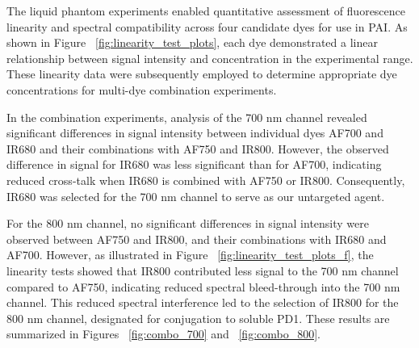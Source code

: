 The liquid phantom experiments enabled quantitative assessment of fluorescence linearity and spectral compatibility across four candidate dyes for use in PAI. As shown in Figure ~\ref{fig:linearity_test_plots}, each dye demonstrated a linear relationship between signal intensity and concentration in the experimental range. These linearity data were subsequently employed to determine appropriate dye concentrations for multi-dye combination experiments.

In the combination experiments, analysis of the 700 nm channel revealed significant differences in signal intensity between individual dyes AF700 and IR680 and their combinations with AF750 and IR800. However, the observed difference in signal for IR680 was less significant than for AF700, indicating reduced cross-talk when IR680 is combined with AF750 or IR800. Consequently, IR680 was selected for the 700 nm channel to serve as our untargeted agent. 

For the 800 nm channel, no significant differences in signal intensity were observed between AF750 and IR800, and their combinations with IR680 and AF700. However, as illustrated in Figure ~\ref{fig:linearity_test_plots_f}, the linearity tests showed that IR800 contributed less signal to the 700 nm channel compared to AF750, indicating reduced spectral bleed-through into the 700 nm channel. This reduced spectral interference led to the selection of IR800 for the 800 nm channel, designated for conjugation to soluble PD1. These results are summarized in Figures ~\ref{fig:combo_700} and ~\ref{fig:combo_800}.
